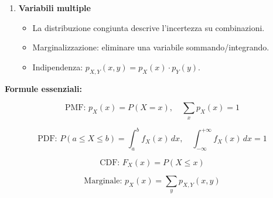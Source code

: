 \documentclass[
  italian,
  letterpaper,
  a4paper,
  11pt,
  open=any]{scrbook}
\providecommand{\tightlist}{%
  \setlength{\itemsep}{0pt}\setlength{\parskip}{0pt}}
\theoremstyle{plain}
\theoremstyle{definition}
\theoremstyle{definition}
\theoremstyle{remark}
\begin{document}
\begin{tcolorbox}
\begin{enumerate}
  \begin{itemize}
  \tightlist
  \item
    \(F_X(x) = P(X \leq x)\) funziona per entrambi i tipi.
  \item
    Fondamentale per quantili e intervalli di credibilità.
  \end{itemize}
\item
  \textbf{Variabili multiple}

  \begin{itemize}
  \tightlist
  \item
    La distribuzione congiunta descrive l'incertezza su combinazioni.
  \item
    Marginalizzazione: eliminare una variabile sommando/integrando.
  \item
    Indipendenza: \(p_{X,Y}(x,y) = p_X(x) \cdot p_Y(y)\).
  \end{itemize}
\end{enumerate}

\textbf{Formule essenziali:}

\[
\text{PMF: } p_X(x) = P(X = x), \quad \sum_x p_X(x) = 1
\]

\[
\text{PDF: } P(a \leq X \leq b) = \int_a^b f_X(x) \, dx, \quad \int_{-\infty}^{+\infty} f_X(x) \, dx = 1
\]

\[
\text{CDF: } F_X(x) = P(X \leq x)
\]

\[
\text{Marginale: } p_X(x) = \sum_y p_{X,Y}(x,y)
\]

\end{tcolorbox}
\end{document}
